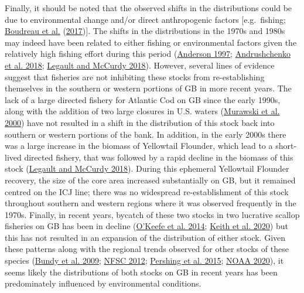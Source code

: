 \documentclass[
]{article}
\begin{document}
Finally, it should be noted that the observed shifts in the distributions could be due to environmental change and/or direct anthropogenic factors {[}e.g.~fishing; \protect\hyperlink{ref-boudreauConnectivityPersistenceLoss2017}{Boudreau et al.} (\protect\hyperlink{ref-boudreauConnectivityPersistenceLoss2017}{2017}){]}. The shifts in the distributions in the 1970s and 1980s may indeed have been related to either fishing or environmental factors given the relatively high fishing effort during this period (\protect\hyperlink{ref-andersonHistoryFisheriesManagement1997}{Anderson 1997}; \protect\hyperlink{ref-andrushchenkoAssessmentEasternGeorges2018}{Andrushchenko et al. 2018}; \protect\hyperlink{ref-legaultStockAssessmentGeorges2018}{Legault and McCurdy 2018}). However, several lines of evidence suggest that fisheries are not inhibiting these stocks from re-establishing themselves in the southern or western portions of GB in more recent years. The lack of a large directed fishery for Atlantic Cod on GB since the early 1990s, along with the addition of two large closures in U.S. waters (\protect\hyperlink{ref-murawskiLargescaleClosedAreas2000}{Murawski et al. 2000}) have not resulted in a shift in the distribution of this stock back into southern or western portions of the bank. In addition, in the early 2000s there was a large increase in the biomass of Yellowtail Flounder, which lead to a short-lived directed fishery, that was followed by a rapid decline in the biomass of this stock (\protect\hyperlink{ref-legaultStockAssessmentGeorges2018}{Legault and McCurdy 2018}). During this ephemeral Yellowtail Flounder recovery, the size of the core area increased substantially on GB, but it remained centred on the ICJ line; there was no widespread re-establishment of this stock throughout southern and western regions where it was observed frequently in the 1970s. Finally, in recent years, bycatch of these two stocks in two lucrative scallop fisheries on GB has been in decline (\protect\hyperlink{ref-okeefeEvaluatingEffectivenessTime2014}{O'Keefe et al. 2014}; \protect\hyperlink{ref-keithEvaluatingSocioeconomicConservation2020}{Keith et al. 2020}) but this has not resulted in an expansion of the distribution of either stock. Given these patterns along with the regional trends observed for other stocks of these species (\protect\hyperlink{ref-bundySealsCodForage2009}{Bundy et al. 2009}; \protect\hyperlink{ref-nfsc54thNortheastRegional2012}{NFSC 2012}; \protect\hyperlink{ref-pershingSlowAdaptationFace2015}{Pershing et al. 2015}; \protect\hyperlink{ref-noaaNOAAYellowtailFlounder2020}{NOAA 2020}), it seems likely the distributions of both stocks on GB in recent years has been predominately influenced by environmental conditions.
\end{document}
